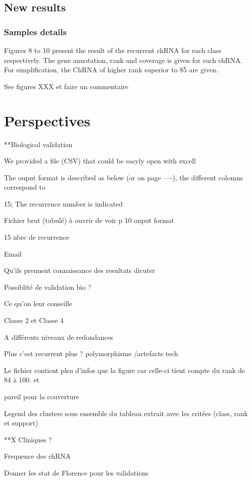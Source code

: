 \documentclass[a4paper]{article}
\begin{document}
\subsection{New results}

\subsubsection{Samples details}

Figures 8 to 10 present the result of the recurrent chRNA for each class respectively. The gene 
annotation, rank and coverage is given for each chRNA. For simplification, the ChRNA of higher rank 
superior to 85 are given. 

See figures XXX et faire un commentaire

\section{Perspectives}

**Biological validation 

We provided a file (CSV) that could be easyly open with excell

The ouput format is described as below (or on page ----), the different colomns correspond to 

15; The recurrence number is indicated

Fichier brut (tabulé) à ouvrir de voir p 10 ouput format 

15 nbre de recurrence

Email 

Qu’ils prennent connaissance des resultats dicuter 

Possiblité de validation bio ?

Ce qu’on leur conseille 

Classe 2 et Classe 4 

A différents niveaux de redondances

Plus c’est recurrent plus ? polymorphisme /artefacts tech 

Le fichier contient plsu d’infos que la figure car celle-ci tient compte du rank de 84 à 100. et 

pareil pour la couverture 

Legend des clusters sous ensemble du tableau extrait avec les critées (class, rank et support) 

**X Cliniques ? 

Frequence des chRNA 

Donner les stat de Florence pour les validations
\end{document}
